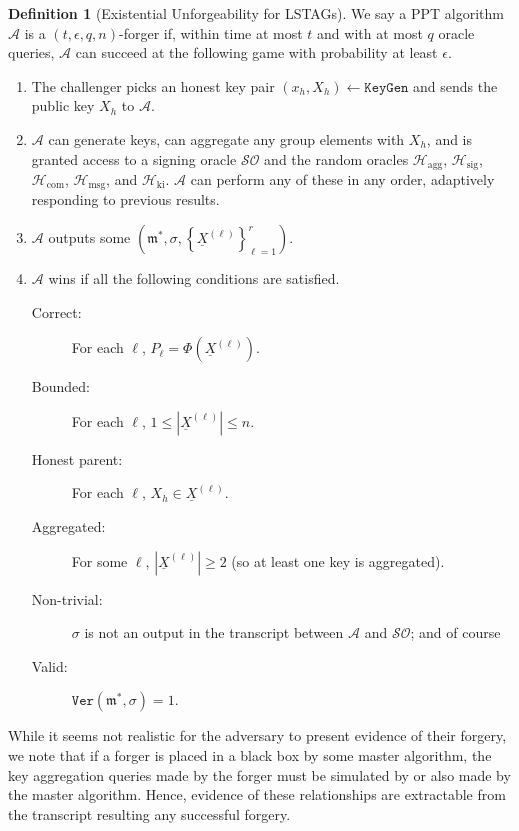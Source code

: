 \documentclass{iacrtrans}
\theoremstyle{definition}
\numberwithin{theorem}{subsection}
\numberwithin{lemma}{theorem}
\newtheorem{defn}[theorem]{Definition}
\newcommand{\adversary}{\mathcal{A}}
\newcommand{\m}{\mathfrak{m}}
\begin{document}
\begin{defn}[Existential Unforgeability for LSTAGs]\label{game}
We say a PPT algorithm $\adversary$ is a $(t, \epsilon, q,n)$-forger if, within time at most $t$ and with at most $q$ oracle queries, $\adversary$ can succeed at the following game with probability at least $\epsilon$.
\begin{enumerate}
\item The challenger picks an honest key pair $(x_h,X_h) \leftarrow \texttt{KeyGen}$ and sends the public key $X_h$ to $\adversary.$

\item $\adversary$ can generate keys, can aggregate any group elements with $X_h$, and is granted access to a signing oracle $\mathcal{SO}$ and the random oracles $\mathcal{H}_{\text{agg}}$, $\mathcal{H}_{\text{sig}}$, $\mathcal{H}_{\text{com}}$, $\mathcal{H}_{\text{msg}}$, and $\mathcal{H}_{\text{ki}}$. $\adversary$ can perform any of these in any order, adaptively responding to previous results.

\item $\adversary$ outputs some $(\m^*, \sigma, \left\{\underline{X}^{(\ell)}\right\}_{\ell = 1}^r)$.

\item $\adversary$ wins if all the following conditions are satisfied. 

\begin{description}
\item [Correct:] For each $\ell$, $P_\ell = \Phi(\underline{X}^{(\ell)})$.
\item [Bounded:] For each $\ell$, $1 \leq \left|\underline{X}^{(\ell)}\right| \leq n$.
\item [Honest parent:] For each $\ell$, $X_h \in \underline{X}^{(\ell)}$.
\item [Aggregated: ] For some $\ell$, $\left|\underline{X}^{(\ell)}\right| \geq 2$ (so at least one key is aggregated).
\item [Non-trivial: ] $\sigma$ is not an output in the transcript between $\mathcal{A}$ and $\mathcal{SO}$; and of course
\item [Valid: ] $\texttt{Ver}(\m^*, \sigma) = 1$.
\end{description}

\end{enumerate}

\end{defn}

While it seems not realistic for the adversary to present evidence of their forgery, we note that if a forger is placed in a black box by some master algorithm, the key aggregation queries made by the forger must be simulated by or also made by the master algorithm. Hence, evidence of these relationships are extractable from the transcript resulting any successful forgery.
\end{document}

